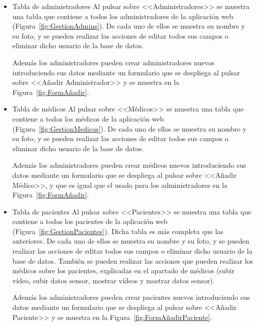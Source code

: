     \begin{itemize}
        \item Tabla de administradores
        Al pulsar sobre <<Administradores>> se muestra una tabla que contiene a todos los administradores de la aplicación web (Figura~\ref{fig:GestionAdmins}). De cada uno de ellos se muestra su nombre y su foto, y se pueden realizar las acciones de editar todos sus campos o eliminar dicho usuario de la base de datos.
        
        Además los administradores pueden crear administradores nuevos introduciendo sus datos mediante un formulario que se despliega al pulsar sobre <<Añadir Administrador>> y se muestra en la Figura~\ref{fig:FormAñadir}.

        
        \item Tabla de médicos
        Al pulsar sobre <<Médicos>> se muestra una tabla que contiene a todos los médicos de la aplicación web (Figura~\ref{fig:GestionMedicos}). De cada uno de ellos se muestra su nombre y su foto, y se pueden realizar las acciones de editar todos sus campos o eliminar dicho usuario de la base de datos.
        
        Además los administradores pueden crear médicos nuevos introduciendo sus datos mediante un formulario que se despliega al pulsar sobre <<Añadir Médico>>, y que es igual que el usado para los administradores en la Figura~\ref{fig:FormAñadir}.
        
        
        \item Tabla de pacientes
        Al pulsar sobre <<Pacientes>> se muestra una tabla que contiene a todos los pacientes de la aplicación web (Figura~\ref{fig:GestionPacientes}). Dicha tabla es más completa que las anteriores. De cada uno de ellos se muestra su nombre y su foto, y se pueden realizar las acciones de editar todos sus campos o eliminar dicho usuario de la base de datos. 
        También se pueden realizar las acciones que pueden realizar los médicos sobre los pacientes, explicadas en el apartado de médicos (subir vídeo, subir datos sensor, mostrar vídeos y mostrar datos sensor).
        
        Además los administradores pueden crear pacientes nuevos introduciendo sus datos mediante un formulario que se despliega al pulsar sobre <<Añadir Paciente>> y se muestra en la Figura~\ref{fig:FormAñadirPaciente}.
    \end{itemize}